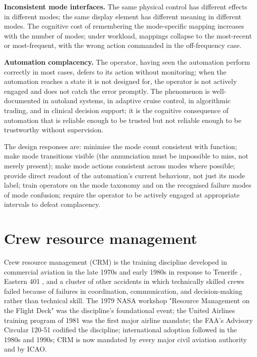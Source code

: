 \textbf{Inconsistent mode interfaces.} The same physical control has different effects in different modes; the same display element has different meaning in different modes. The cognitive cost of remembering the mode-specific mapping increases with the number of modes; under workload, mappings collapse to the most-recent or most-frequent, with the wrong action commanded in the off-frequency case.

\textbf{Automation complacency.} The operator, having seen the automation perform correctly in most cases, defers to its action without monitoring; when the automation reaches a state it is not designed for, the operator is not actively engaged and does not catch the error promptly. The phenomenon is well-documented in autoland systems, in adaptive cruise control, in algorithmic trading, and in clinical decision support; it is the cognitive consequence of automation that is reliable enough to be trusted but not reliable enough to be trustworthy without supervision.

The design responses are: minimise the mode count consistent with function; make mode transitions visible (the annunciation must be impossible to miss, not merely present); make mode actions consistent across modes where possible; provide direct readout of the automation's current behaviour, not just its mode label; train operators on the mode taxonomy and on the recognised failure modes of mode confusion; require the operator to be actively engaged at appropriate intervals to defeat complacency.

\section{Crew resource management}

Crew resource management (CRM) is the training discipline developed in commercial aviation in the late 1970s and early 1980s in response to Tenerife \cite{acc:ciaiac-tenerife-1978}, Eastern 401 \cite{acc:ntsb-aar73-14}, and a cluster of other accidents in which technically skilled crews failed because of failures in coordination, communication, and decision-making rather than technical skill. The 1979 NASA workshop "Resource Management on the Flight Deck" was the discipline's foundational event; the United Airlines training program of 1981 was the first major airline mandate; the FAA's Advisory Circular 120-51 codified the discipline; international adoption followed in the 1980s and 1990s; CRM is now mandated by every major civil aviation authority and by ICAO.

